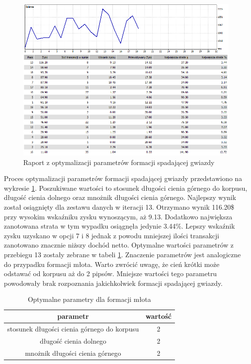 \documentclass[pdflatex,11pt]{aghdpl}
\begin{document}
\begin{figure}[h!]
\begin{center}
\includegraphics[width=14cm]{shootingstar/optymalizacja.png}
\caption{Raport z optymalizacji parametrów formacji spadającej gwiazdy}
\label{opt_gwiazda}
\end{center}
\end{figure} 
Proces optymalizacji parametrów formacji spadającej gwiazdy przedstawiono na wykresie \ref{opt_gwiazda}. Poszukiwane wartości to stosunek długości cienia górnego do korpusu, długość cienia dolnego oraz mnożnik długości cienia górnego. Najlepszy wynik został osiągnięty dla zestawu danych w iteracji 13. Otrzymano wynik 116.20\$ przy wysokim wskaźniku zysku wynoszącym, aż 9.13. Dodatkowo największa zanotowana strata w tym wypadku osiągnęła jedynie 3.44\%. Lepszy wskaźnik zysku uzyskano w opcji 7 i 8 jednak z powodu mniejszej ilości transakcji zanotowano znacznie niższy dochód netto. Optymalne wartości parametrów z przebiegu 13 zostały zebrane w tabeli \ref{parametry_gwiazda}. Znaczenie parametrów jest analogiczne do przypadku formacji młota. Warto zwrócić uwagę, że cień krótki może odstawać od korpusu aż do 2 pipsów. Mniejsze wartości tego parametru powodowały brak rozpoznania jakichkolwiek formacji spadającej gwiazdy.
\begin{table}[h!]
\caption{Optymalne parametry dla formacji młota}
\begin{center}
\begin{tabular}{|c|c|}
\hline 
parametr & wartość \\
\hline
stosunek długości cienia górnego do korpusu & 2\\
\hline
długość cienia dolnego & 2\\
\hline
mnożnik długości cienia górnego & 2\\
\hline
\end{tabular} 
\label{parametry_gwiazda}
\end{center}
\end{table}
\end{document}
